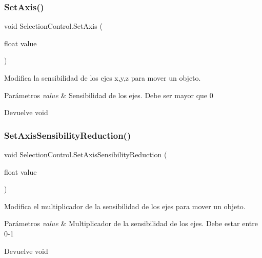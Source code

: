 \subsubsection{\texorpdfstring{SetAxis()}{SetAxis()}}
{\footnotesize\ttfamily void Selection\+Control.\+Set\+Axis (\begin{DoxyParamCaption}\item[{float}]{value }\end{DoxyParamCaption})\hspace{0.3cm}{\ttfamily [inline]}}

Modifica la sensibilidad de los ejes x,y,z para mover un objeto. 
\begin{DoxyParams}{Parámetros}
{\em value} & Sensibilidad de los ejes. Debe ser mayor que 0 \\
\hline
\end{DoxyParams}
\begin{DoxyReturn}{Devuelve}
void 
\end{DoxyReturn}
\mbox{\label{class_selection_control_ab62778748bb69e20a9fd3318a3083853}} 
\subsubsection{\texorpdfstring{SetAxisSensibilityReduction()}{SetAxisSensibilityReduction()}}
{\footnotesize\ttfamily void Selection\+Control.\+Set\+Axis\+Sensibility\+Reduction (\begin{DoxyParamCaption}\item[{float}]{value }\end{DoxyParamCaption})\hspace{0.3cm}{\ttfamily [inline]}}

Modifica el multiplicador de la sensibilidad de los ejes para mover un objeto. 
\begin{DoxyParams}{Parámetros}
{\em value} & Multiplicador de la sensibilidad de los ejes. Debe estar entre 0-\/1 \\
\hline
\end{DoxyParams}
\begin{DoxyReturn}{Devuelve}
void 
\end{DoxyReturn}
\mbox{\label{class_selection_control_ae30e28c63db233cb7a7b9d71174c2846}} 
